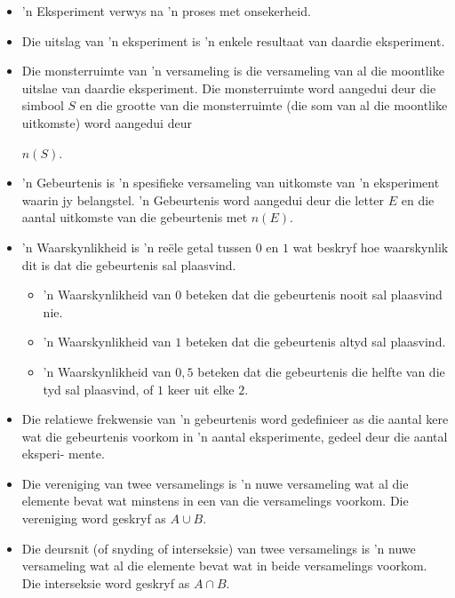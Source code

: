 \begin{itemize}
\item ’n Eksperiment verwys na ’n proses met onsekerheid.

\item Die uitslag van ’n eksperiment is ’n enkele resultaat van daardie eksperiment.


\item Die monsterruimte van ’n versameling is die versameling van al die moontlike uitslae
van daardie eksperiment. Die monsterruimte word aangedui deur die simbool $S$ en
die grootte van die monsterruimte (die som van al die moontlike uitkomste) word
aangedui deur

  $n(S)$.

\item ’n Gebeurtenis is ’n spesifieke versameling van uitkomste van ’n eksperiment waarin
jy belangstel. ’n Gebeurtenis word aangedui deur die letter $E$ en die aantal uitkomste
van die gebeurtenis met
 $n(E)$.

\item ’n Waarskynlikheid is ’n reële getal tussen $0$ en $1$ wat beskryf hoe waarskynlik dit is
dat die gebeurtenis sal plaasvind.

\begin{itemize}
\item ’n Waarskynlikheid van $0$ beteken dat die gebeurtenis nooit sal plaasvind nie.

\item ’n Waarskynlikheid van $1$ beteken dat die gebeurtenis altyd sal plaasvind.

\item ’n Waarskynlikheid van $0,5$ beteken dat die gebeurtenis die helfte van die tyd sal plaasvind, of
$1$ keer uit elke $2$.

\end{itemize}

\item Die relatiewe frekwensie van ’n gebeurtenis word gedefinieer as die aantal kere wat
die gebeurtenis voorkom in ’n aantal eksperimente, gedeel deur die aantal eksperi-
mente.


\item Die vereniging van twee versamelings is ’n nuwe versameling wat al die elemente
bevat wat minstens in een van die versamelings voorkom. Die vereniging word
geskryf as
 $A \cup B$.

\item Die deursnit (of snyding of interseksie) van twee versamelings is ’n nuwe versameling
wat al die elemente bevat wat in beide versamelings voorkom. Die interseksie word
geskryf as
 $A \cap B$.


\end{itemize}
